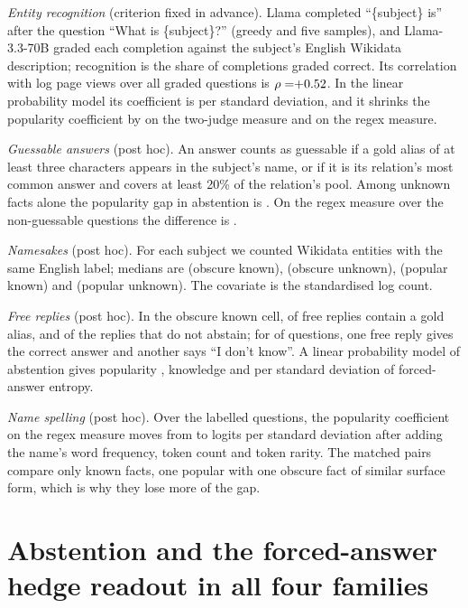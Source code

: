 \documentclass{article}
\newcommand{\idk}{``I don't know''}
\begin{document}
\emph{Entity recognition} (criterion fixed in advance). Llama completed ``\{subject\} is'' after the question ``What is \{subject\}?'' (greedy and five samples), and Llama-3.3-70B graded each completion against the subject's English Wikidata description; recognition is the share of completions graded correct. Its correlation with log page views over all graded questions is $\rho=\ekRho$. In the linear probability model its coefficient is \ekCoef{} \ekCoefCI{} per standard deviation, and it shrinks the popularity coefficient by \ekShrink{} on the two-judge measure and \ekShrinkRegex{} on the regex measure.

\emph{Guessable answers} (post hoc). An answer counts as guessable if a gold alias of at least three characters appears in the subject's name, or if it is its relation's most common answer and covers at least 20\% of the relation's pool. Among unknown facts alone the popularity gap in abstention is \hmLlamaPopUnkOnly{} \hmLlamaPopUnkOnlyCI. On the regex measure over the \gsRegexN{} non-guessable questions the difference is \gsRegexDiff{} \gsRegexDiffCI.

\emph{Namesakes} (post hoc). For each subject we counted Wikidata entities with the same English label; medians are \amObsKnownHom{} (obscure known), \amObsUnkHom{} (obscure unknown), \amPopKnownHom{} (popular known) and \amPopUnkHom{} (popular unknown). The covariate is the standardised log count.

\emph{Free replies} (post hoc). In the obscure known cell, \rcObsKnownCorrect{} of free replies contain a gold alias, and \rcObsKnownNonAbsCorrect{} of the replies that do not abstain; for \rcBothN{} of \rcBothOf{} questions, one free reply gives the correct answer and another says \idk. A linear probability model of abstention gives popularity \rcPopEnt{} \rcPopEntCI, knowledge \rcKnowEnt{} \rcKnowEntCI{} and \rcEntCoef{} per standard deviation of forced-answer entropy.

\emph{Name spelling} (post hoc). Over the \faLlamaN{} labelled questions, the popularity coefficient on the regex measure moves from \scPoolPop{} to \scPoolPopSurface{} logits per standard deviation after adding the name's word frequency, token count and token rarity. The matched pairs compare only known facts, one popular with one obscure fact of similar surface form, which is why they lose more of the gap.

\section{Abstention and the forced-answer hedge readout in all four families}
\label{app:families}
\end{document}
